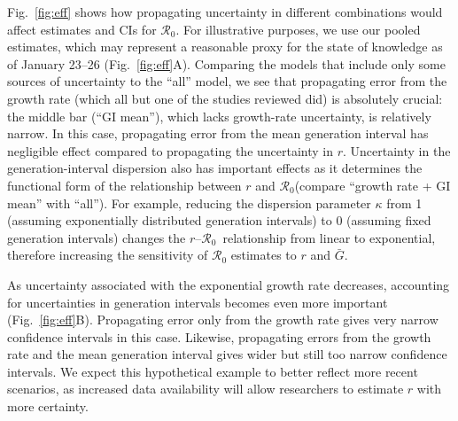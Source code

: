 \documentclass[12pt]{article}
\newcommand{\fref}[1]{Fig.~\ref{fig:#1}}
\newcommand{\Ro}{\ensuremath{{\mathcal R}_{0}}\xspace}
\begin{document}
\fref{eff} shows how propagating uncertainty in different combinations would affect estimates and CIs for \Ro. For illustrative purposes, we use our pooled estimates, which may represent a reasonable proxy for the state of knowledge as of January 23--26 (\fref{eff}A).
Comparing the models that include only some sources of uncertainty to the ``all'' model, we see that propagating error from the growth rate (which all but one of the studies reviewed did) is absolutely crucial: the middle bar (``GI mean''), which lacks growth-rate uncertainty, is relatively narrow.
In this case, propagating error from the mean generation interval has negligible effect compared to propagating the uncertainty in $r$.
Uncertainty in the generation-interval dispersion also has important effects as it determines the functional form of the relationship between $r$ and \Ro (compare ``growth rate + GI mean'' with ``all'').
For example, reducing the dispersion parameter $\kappa$ from 1 (assuming exponentially distributed generation intervals) to 0 (assuming fixed generation intervals) changes the $r$--\Ro\ relationship from linear to exponential, therefore increasing the sensitivity of \Ro estimates to $r$ and $\bar G$.

As uncertainty associated with the exponential growth rate decreases, accounting for uncertainties in generation intervals becomes even more important (\fref{eff}B).
Propagating error only from the growth rate gives very narrow confidence intervals in this case. 
Likewise, propagating errors from the growth rate and the mean generation interval gives wider but still too narrow confidence intervals.
We expect this hypothetical example to better reflect more recent scenarios, as increased data availability will allow researchers to estimate $r$ with more certainty.
\end{document}
